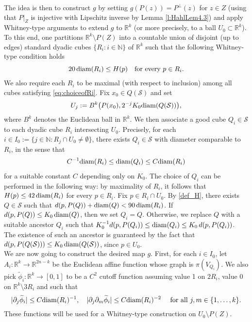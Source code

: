 \documentclass[12pt]{amsart}
\newcommand{\R}{\mathbb R}
\newcommand{\diam}{{\rm diam}}
\newcommand{\N}{\mathbb N}
\numberwithin{equation}{section}
\theoremstyle{plain}
\theoremstyle{definition}
\theoremstyle{remark}
\begin{document}
The idea is then to construct $g$ by setting $g(P(z))=P^{\bot}(z)$ for $z\in Z$ (using that $P|_Z$ is injective with Lipschitz inverse by Lemma \ref{l:HahlLem4.3}) and apply Whitney-type arguments to extend $g$ to  $\mathbb{R}^k$ (or more precisely, to a ball $U_0 \subset \mathbb{R}^k$).
To this end, one partitions $\R^k\setminus P(Z)$ into a countable union of disjoint (up to edges) standard dyadic cubes $\{R_i:i\in \N\}$ of $\R^k$ such that the following Whitney-type condition holds
\begin{equation}\label{eq:choiceofRi}20 \,\diam(R_i)\leq H(p)\quad\text{for every }p\in R_i.\end{equation} We also require each $R_i$ to be maximal (with respect to inclusion) among all cubes satisfying \eqref{eq:choiceofRi}.
Fix $x_0\in Q(\mathcal S)$ and set 
\begin{equation}\label{eq:Uj}
U_j:=B^k\big(P(x_0), 2^{-j}K_0\diam(Q(\mathcal S))\big),
\end{equation}
where $B^k$ denotes the Euclidean ball in $\R^k$.
We then associate a good cube $Q_i\in\mathcal S$ to each dyadic cube $R_i$ intersecting $U_0$. Precisely, for each $i\in I_0:=\{j\in \N:R_j\cap U_0\neq\emptyset \}$, there exists $Q_i\in\mathcal S$ with diameter comparable to $R_i$, in the sense that 
\[C^{-1}\diam(R_i)\leq \diam(Q_i)\leq C\diam(R_i)\]
for a suitable constant $C$ depending only on $K_0$. The choice of $Q_i$ can be performed in the following way: by maximality of $R_i$, it follows that $H(p)\leq 42\, \diam(R_i)$ for every $p\in R_i$. Fix $p\in R_i\cap U_0$. By \eqref{def_H}, there exists $Q\in\mathcal S$ such that $d(p,P(Q))+\diam(Q)<90\,\diam(R_i)$. If $d(p,P(Q))\leq K_0\,\diam(Q)$, then we set $Q_i=Q$. Otherwise, we replace $Q$ with a suitable ancestor $Q_i$ such that $K_0^{-1}d(p, P(Q_i))\leq \diam(Q_i)\leq K_0\, d(p,P(Q_i))$. The existence of such an ancestor is guaranteed by the fact that $d(p, P(Q(\mathcal S)))\leq K_0\,\diam (Q(\mathcal S))$, since $p\in U_0$. \medskip\\%
We are now going to construct the desired map $g$. First, for each $i\in I_0$, let $A_i:\R^k\to\R^{2n-k}$ be the Euclidean affine function whose graph is $\pi(V_{Q_i})$. We also pick $\widetilde \phi_i:\R^k\to[0,1]$ to be a $C^2$ cutoff function assuming value 1 on $2R_i$, value 0 on $\R^k\setminus 3R_i$ and such that \[|\partial_j\widetilde \phi_i|\leq C\diam(R_i)^{-1},\quad |\partial_j\partial_m\widetilde \phi_i|\leq C\diam(R_i)^{-2}\quad\text{ for all }j,m\in\{1,\dots,k\}.\] These functions will be used for a Whitney-type construction on $U_0\setminus P(Z)$.
\end{document}
